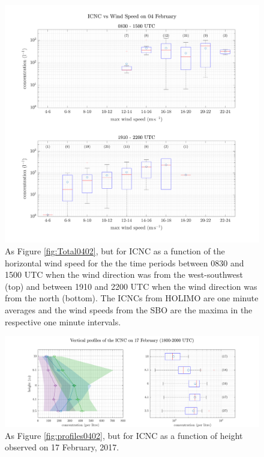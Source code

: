 \documentclass[draft,linenumbers]{agujournal}
\begin{document}
\begin{figure}[t]
 \centering
 	\includegraphics[width=14cm]{0402_OverviewWS.png}
 \caption{As Figure \ref{fig:Total0402}, but for ICNC as a function of the horizontal wind speed for the the time periods between 0830 and 1500 UTC when the wind direction was from the west-southwest (top) and between 1910 and 2200 UTC when the wind direction was from the north (bottom). The ICNCs from HOLIMO are one minute averages and the wind speeds from the SBO are the maxima in the respective one minute intervals.}
 \label{fig:ICNCvsWSMAX0402}
\end{figure}

\begin{figure}[t]
 \centering
 	\includegraphics[width=14cm]{1702_Overview.png}
 \caption{As Figure \ref{fig:profiles0402}, but for ICNC as a function of height observed on 17 February, 2017.}
 \label{fig:profiles1702}
\end{figure}
\end{document}
